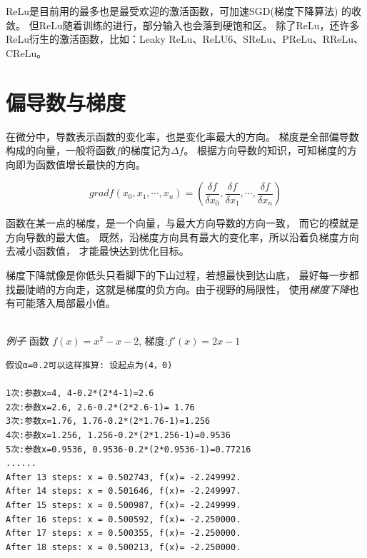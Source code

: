 ReLu是目前用的最多也是最受欢迎的激活函数，可加速SGD(梯度下降算法) 的收敛。
但ReLu随着训练的进行，部分输入也会落到硬饱和区。
除了ReLu，还许多ReLu衍生的激活函数，比如：Leaky ReLu、ReLU6、SReLu、PReLu、RReLu、CReLu。


\section{偏导数与梯度}
在微分中，导数表示函数的变化率，也是变化率最大的方向。
梯度是全部偏导数构成的向量，一般将函数$f$的梯度记为$\Delta f$。
根据方向导数的知识，可知梯度的方向即为函数值增长最快的方向。

$$ grad f(x_0, x_1,\cdots, x_n) = (
		\frac{\delta f}{\delta x_0},
		\frac{\delta f}{\delta x_1},
		\cdots,
		\frac{\delta f}{\delta x_n}
) $$

\noindent
函数在某一点的梯度，是一个向量，与最大方向导数的方向一致，
而它的模就是方向导数的最大值。
既然，沿梯度方向具有最大的变化率，所以沿着负梯度方向去减小函数值，
才能最快达到优化目标。

\begin{figure}[!ht]
\centering
{}
\hspace{0.1cm}
\end{figure}

\noindent
梯度下降就像是你低头只看脚下的下山过程，若想最快到达山底，
最好每一步都找最陡峭的方向走，这就是梯度的负方向。由于视野的局限性，
使用\emph{梯度下降}也有可能落入局部最小值。

\ \\
\noindent \emph{例子}
	函数 $f(x)=x^2-x-2$, 梯度:$f'(x) = 2x-1$
\begin{lstlisting}[numbers=none]
假设α=0.2可以这样推算: 设起点为(4，0)

1次:参数x=4, 4-0.2*(2*4-1)=2.6
2次:参数x=2.6, 2.6-0.2*(2*2.6-1)= 1.76 
3次:参数x=1.76, 1.76-0.2*(2*1.76-1)=1.256 
4次:参数x=1.256, 1.256-0.2*(2*1.256-1)=0.9536 
5次:参数x=0.9536, 0.9536-0.2*(2*0.9536-1)=0.77216 
......
After 13 steps: x = 0.502743, f(x)= -2.249992. 
After 14 steps: x = 0.501646, f(x)= -2.249997. 
After 15 steps: x = 0.500987, f(x)= -2.249999. 
After 16 steps: x = 0.500592, f(x)= -2.250000. 
After 17 steps: x = 0.500355, f(x)= -2.250000. 
After 18 steps: x = 0.500213, f(x)= -2.250000.
\end{lstlisting}

